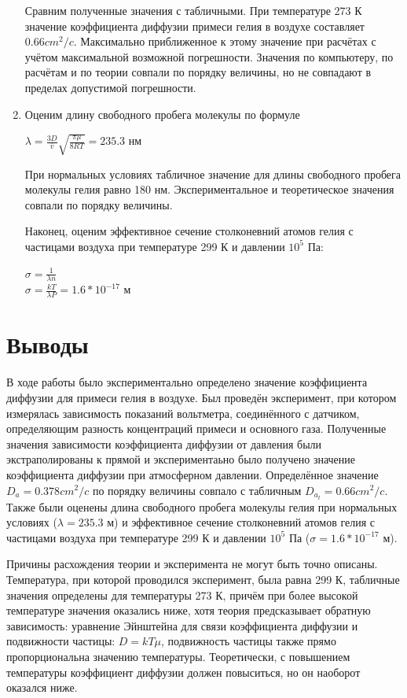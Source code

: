 \documentclass[12pt,a4paper]{article}
\begin{document}
\begin{enumerate}
Сравним полученные значения с табличными. При температуре 273 К значение коэффициента диффузии примеси гелия в воздухе составляет $0.66 cm^2/c$. Максимально приближенное к этому значение при расчётах с учётом максимальной возможной погрешности. Значения по компьютеру, по расчётам и по теории совпали по порядку величины, но не совпадают в пределах допустимой погрешности. 

\item Оценим длину свободного пробега молекулы по формуле 
\begin{center}
$\lambda = \frac{3D}{\bar v} \sqrt{\frac{\pi \mu }{8RT}} = 235.3 $ нм
\end{center}
При нормальных условиях табличное значение для длины свободного пробега молекулы гелия равно 180 нм. Экспериментальное и теоретическое значения совпали по порядку величины.

Наконец, оценим эффективное сечение столконевний атомов гелия с частицами воздуха при температуре 299 К и давлении $10^5$ Па:

\begin{center}
$\sigma = \frac{1}{\lambda n}$\\
$\sigma = \frac{kT}{\lambda P} = 1.6 * 10^{-17}$ м
\end{center}
\end{enumerate}

\newpage


\section{Выводы}
В ходе работы было экспериментально определено значение коэффициента диффузии для примеси гелия в воздухе. Был проведён эксперимент, при котором измерялась зависимость показаний вольтметра, соединённого с датчиком, определяющим разность концентраций примеси и основного газа. Полученные значения зависимости коэффициента диффузии от давления были экстраполированы к прямой и экспериментаьно было получено значение коэффициента диффузии при атмосферном давлении. Определённое значение $D_a = 0.378 cm^2/c$  по порядку величины совпало с табличным $D_{a_{t}} = 0.66 cm^2/c$. Также были оценены длина свободного пробега молекулы гелия при нормальных условиях ($\lambda =  235.3$ м) и эффективное сечение столконевний атомов гелия с частицами воздуха при температуре 299 К и давлении $10^5$ Па ($\sigma = 1.6 * 10^{-17}$ м).\par
Причины расхождения теории и эксперимента не могут быть точно описаны. Температура, при которой проводился эксперимент, была равна 299 К, табличные значения определены для температуры 273 К, причём при более высокой температуре значения оказались ниже, хотя теория предсказывает обратную зависимость: уравнение Эйнштейна для связи коэффициента диффузии и подвижности частицы: $D = kT\mu$, подвижность частицы также прямо пропорциональна значению температуры. Теоретически, с повышением температуры коэффициент диффузии должен повыситься, но он наоборот оказался ниже. \par
\end{document}
